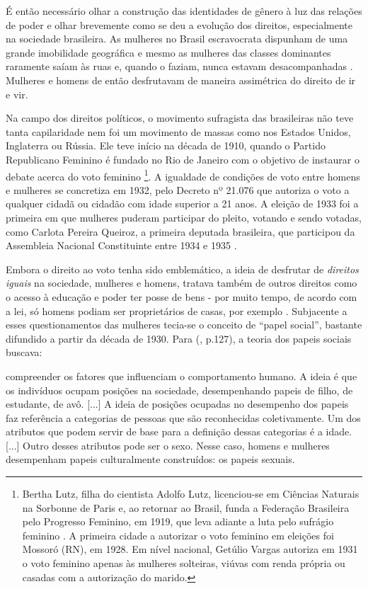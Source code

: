 É então necessário olhar a construção das identidades de gênero à luz das relações de poder e olhar brevemente como se deu a evolução dos direitos, especialmente na sociedade brasileira. As mulheres no Brasil escravocrata dispunham de uma grande imobilidade geográfica e mesmo as mulheres das classes dominantes raramente saíam às ruas e, quando o faziam, nunca estavam desacompanhadas \cite{SAFFIOTI2013}. Mulheres e homens de então desfrutavam de maneira assimétrica do direito de ir e vir.

Na campo dos direitos políticos, o movimento sufragista das brasileiras não teve tanta capilaridade nem foi um movimento de massas como nos Estados Unidos, Inglaterra ou Rússia. Ele teve início na década de 1910, quando o Partido Republicano Feminino é fundado no Rio de Janeiro com o objetivo de instaurar o debate acerca do voto feminino%
\footnote{Bertha Lutz, filha do cientista Adolfo Lutz, licenciou-se em Ciências Naturais na Sorbonne de Paris e, ao retornar ao Brasil, funda a Federação Brasileira pelo Progresso Feminino, em 1919, que leva adiante a luta pelo sufrágio feminino \cite{PINSKY2003}. A primeira cidade a autorizar o voto feminino em eleições foi Mossoró (RN), em 1928. Em nível nacional, Getúlio Vargas autoriza em 1931 o voto feminino apenas às mulheres solteiras, viúvas com renda própria ou casadas com a autorização do marido.}.
A igualdade de condições de voto entre homens e mulheres se concretiza em 1932, pelo Decreto nº 21.076 que autoriza o voto a qualquer cidadã ou cidadão com idade superior a 21 anos. A eleição de 1933 foi a primeira em que mulheres puderam participar do pleito, votando e sendo votadas, como Carlota Pereira Queiroz, a primeira deputada brasileira, que participou da Assembleia Nacional Constituinte entre 1934 e 1935 \cite{TABAK1989}.

Embora o direito ao voto tenha sido emblemático, a ideia de desfrutar de \emph{direitos iguais} na sociedade, mulheres e homens, tratava também de outros direitos como o acesso à educação e poder ter posse de bens - por muito tempo, de acordo com a lei, só homens podiam ser proprietários de casas, por exemplo \cite{PISCITELLI2009}. Subjacente a esses questionamentos das mulheres tecia-se o conceito de ``papel social'', bastante difundido a partir da década de 1930. Para  (\citeyear{PISCITELLI2009}, p.127), a teoria dos papeis sociais buscava:

\begin{citacao}
compreender os fatores que influenciam o comportamento humano. A ideia é que os indivíduos ocupam posições na sociedade, desempenhando papeis de filho, de estudante, de avô. [...] A ideia de posições ocupadas no desempenho dos papeis faz referência a categorias de pessoas que são reconhecidas coletivamente. Um dos atributos que podem servir de base para a definição dessas categorias é a idade. [...] Outro desses atributos pode ser o sexo. Nesse caso, homens e mulheres desempenham papeis culturalmente construídos: os papeis sexuais.
\end{citacao}

